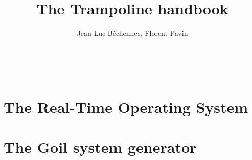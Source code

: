 \documentclass[11pt]{manual}
\title{The Trampoline handbook}
\author{Jean-Luc B\'echennec, Florent Pavin}
\begin{document}
\maketitle
~\newpage
\setcounter{tocdepth}{2}
\tableofcontents

\part{The Real-Time Operating System}







\part{The Goil system generator}


\printindex



 
\end{document}
